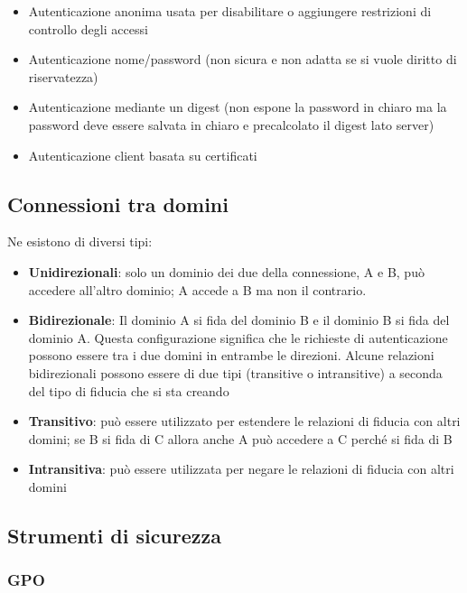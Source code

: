 \begin{itemize}
\item
  Autenticazione anonima usata per disabilitare o aggiungere restrizioni
  di controllo degli accessi
\item
  Autenticazione nome/password (non sicura e non adatta se si vuole
  diritto di riservatezza)
\item
  Autenticazione mediante un digest (non espone la password in chiaro ma
  la password deve essere salvata in chiaro e precalcolato il digest
  lato server)
\item
  Autenticazione client basata su certificati
\end{itemize}

\subsection{Connessioni tra domini}\label{connessioni-tra-domini}

Ne esistono di diversi tipi:

\begin{itemize}
\item
  \textbf{Unidirezionali}: solo un dominio dei due della connessione, A
  e B, può accedere all'altro dominio; A accede a B ma non il contrario.
\item
  \textbf{Bidirezionale}: Il dominio A si fida del dominio B e il
  dominio B si fida del dominio A. Questa configurazione significa che
  le richieste di autenticazione possono essere tra i due domini in
  entrambe le direzioni. Alcune relazioni bidirezionali possono essere
  di due tipi (transitive o intransitive) a seconda del tipo di fiducia
  che si sta creando
\item
  \textbf{Transitivo}: può essere utilizzato per estendere le relazioni
  di fiducia con altri domini; se B si fida di C allora anche A può
  accedere a C perché si fida di B
\item
  \textbf{Intransitiva}: può essere utilizzata per negare le relazioni
  di fiducia con altri domini
\end{itemize}

\subsection{Strumenti di sicurezza}\label{strumenti-di-sicurezza}

\subsubsection{GPO}\label{gpo}

